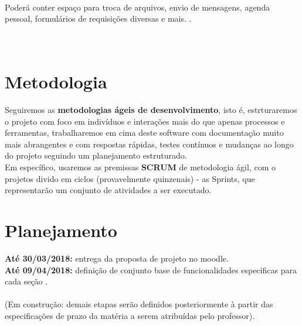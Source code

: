 \documentclass[12pt]{exam}
\begin{document}
    \\ Poderá conter espaço para troca de arquivos, envio de mensagens, agenda pessoal, formulários de requisições diversas e mais. 
   . 
	\\ \\ \\  
    
\section{Metodologia}
	Seguiremos as \textbf{metodologias ágeis de desenvolvimento}, isto é, estrturaremos o projeto com foco em indivíduos e interações mais do que apenas processos e ferramentas, trabalharemos em cima deste software com documentação muito mais abrangentes e com respostas rápidas, testes contínuos e mudanças ao longo do projeto seguindo um planejamento estruturado.
    \\ Em específico, usaremos as premissas \textbf{SCRUM} de metodologia ágil, com o projetos divido em ciclos (provavelmente quinzenais) - as Sprints, que representarão um conjunto de atividades a ser executado. 
    
\section{Planejamento}
	\textbf{Até 30/03/2018:} entrega da proposta de projeto no moodle. 
    \\ \textbf{Até 09/04/2018:} definição de conjunto base de funcionalidades específicas para cada seção
    .
    \\ \\ (Em construção: demais etapas serão definidos posteriormente à partir das especificações de prazo da matéria a serem atribuídas pelo professor).
    

    

	 
	
	
	
\end{document}
